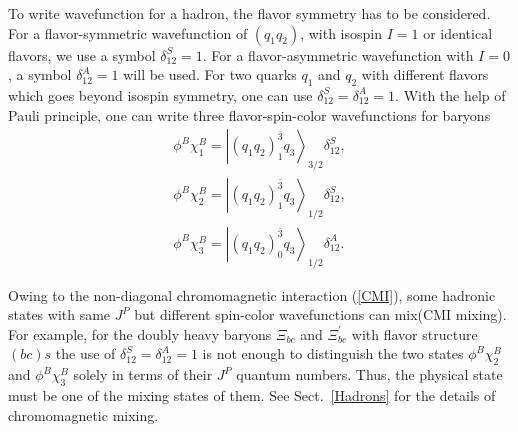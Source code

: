 \documentclass[12pt,prd,onecolumn,floatfix,nofootinbib]{revtex4}
\begin{document}
To write wavefunction for a hadron, the flavor symmetry has to be
considered. For a flavor-symmetric wavefunction of $\left( q_{1}q_{2}\right)
$, with isospin $I=1$ or identical flavors, we use a symbol $\delta
_{12}^{S}=1$. For a flavor-asymmetric wavefunction with $I=0$, a symbol $%
\delta _{12}^{A}=1$ will be used. For two quarks $q_{1}$ and $q_{2}$ with
different flavors which goes beyond isospin symmetry, one can use $\delta
_{12}^{S}=\delta _{12}^{A}=1$. With the help of Pauli principle, one can
write three flavor-spin-color wavefunctions for baryons
\begin{equation}
\begin{aligned} \phi^{B}\chi_{1}^{B}={\left|
{\left(q_{1}q_{2}\right)}_{1}^{\bar{3}} q_{3} \right\rangle}_{3/2}
\delta_{12}^{S}, \\ \phi^{B}\chi_{2}^{B}={\left|
{\left(q_{1}q_{2}\right)}_{1}^{\bar{3}} q_{3} \right\rangle}_{1/2}
\delta_{12}^{S}, \\ \phi^{B}\chi_{3}^{B}={\left|
{\left(q_{1}q_{2}\right)}_{0}^{\bar{3}} q_{3} \right\rangle}_{1/2}
\delta_{12}^{A}. \end{aligned}  \label{colorspinB}
\end{equation}

Owing to the non-diagonal chromomagnetic interaction (\ref{CMI}), some
hadronic states with same $J^{P}$ but different spin-color wavefunctions can
mix(CMI mixing). For example, for the doubly heavy baryons $\Xi _{bc}$ and $%
\Xi _{bc}^{\prime }$ with flavor structure $(bc)s$ the use of $\delta
_{12}^{S}=\delta _{12}^{A}=1$ is not enough to distinguish the two
states $\phi ^{B}\chi _{2}^{B}$ and $\phi ^{B}\chi _{3}^{B}$ solely
in terms of their $J^{P}$ quantum numbers. Thus, the physical state must be
one of the mixing states of them. See Sect.~\ref{Hadrons} for the details
of chromomagnetic mixing.
\end{document}
